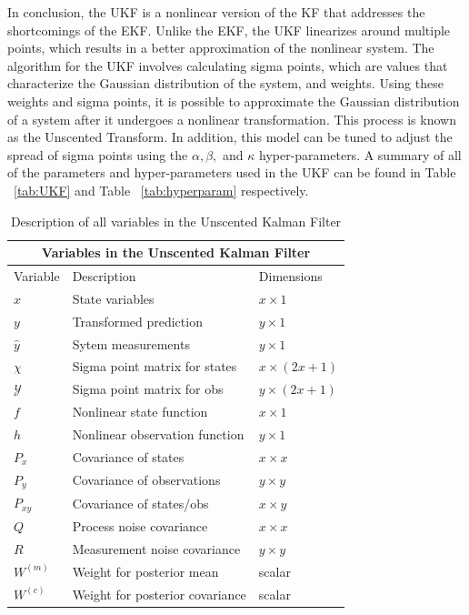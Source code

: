 \noindent In conclusion, the UKF is a nonlinear version of the KF that addresses the shortcomings of the EKF. Unlike the EKF, the UKF linearizes around multiple points, which results in a better approximation of the nonlinear system. The algorithm for the UKF involves calculating sigma points, which are values that characterize the Gaussian distribution of the system, and weights. Using these weights and sigma points, it is possible to approximate the Gaussian distribution of a system after it undergoes a nonlinear transformation. This process is known as the Unscented Transform. In addition, this model can be tuned to adjust the spread of sigma points using the $\alpha, \beta, $ and $\kappa$ hyper-parameters. A summary of all of the parameters and hyper-parameters used in the UKF can be found in Table ~\ref{tab:UKF} and Table ~\ref{tab:hyperparam} respectively. 

    
\begin{center}
\begin{table}[h]
\centering
\caption{Description of all variables in the Unscented Kalman Filter} \label{tab:sometab}
\begin{tabular}{ |p{2cm}||p{5cm}|p{2cm}| }
    \hline
    \multicolumn{3}{|c|}{Variables in the Unscented Kalman Filter } \\ 
    \hline
    Variable & Description & Dimensions \\
    \hline
    $x$ & State variables & $ x \times 1 $\\ 
    $y$ & Transformed prediction & $y \times 1 $\\ 
    $\hat y$ & Sytem measurements & $y \times 1 $\\ 
    $\chi $ & Sigma point matrix for states&$ x \times (2x + 1) $\\
    $\mathcal{Y}$ & Sigma point matrix for obs &$ y \times (2x + 1) $\\
    $f$ & Nonlinear state function & $x \times 1 $  \\ 
    $h$ & Nonlinear observation function & $y \times 1$\\
    $P_x$ & Covariance of states & $x \times x $  \\
    $P_y$ & Covariance of observations& $y \times y $  \\
    $P_{xy}$ & Covariance of states/obs& $x \times y $  \\
    $Q$ & Process noise covariance & $x \times x $  \\
    $R$ & Measurement noise covariance & $y \times y $  \\
    $W^{(m)}$ & Weight for posterior mean & scalar \\
    $W^{(c)}$ & Weight for posterior covariance & scalar \\
    \hline
\end{tabular} 

\end{table}
\label{tab:UKF}
\end{center}



